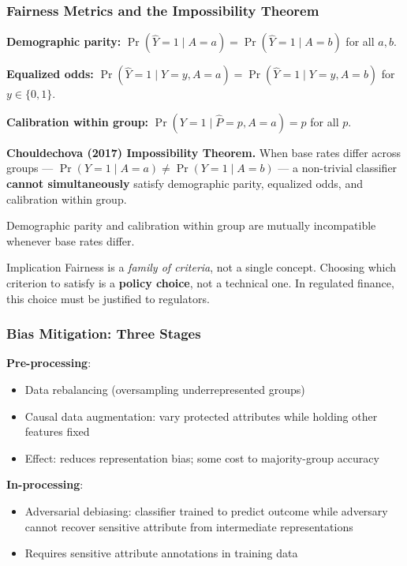 \documentclass[9pt,t]{beamer}
\begin{document}
\begin{frame}
\frametitle{Fairness Metrics and the Impossibility Theorem}

\textbf{Demographic parity:}
$\Pr(\hat{Y} = 1 \mid A = a) = \Pr(\hat{Y} = 1 \mid A = b)$ for all $a, b$.

\smallskip
\textbf{Equalized odds:}
$\Pr(\hat{Y} = 1 \mid Y = y, A = a) = \Pr(\hat{Y} = 1 \mid Y = y, A = b)$ for $y \in \{0, 1\}$.

\smallskip
\textbf{Calibration within group:}
$\Pr(Y = 1 \mid \hat{P} = p, A = a) = p$ for all $p$.

\smallskip
\begin{underhood}
  \textbf{Chouldechova (2017) Impossibility Theorem.}
  When base rates differ across groups --- $\Pr(Y=1 \mid A=a) \neq \Pr(Y=1 \mid A=b)$ ---
  a non-trivial classifier \textbf{cannot simultaneously} satisfy demographic parity,
  equalized odds, and calibration within group.

  Demographic parity and calibration within group are mutually incompatible
  whenever base rates differ.
\end{underhood}

\medskip
\begin{block}{Implication}
  Fairness is a \emph{family of criteria}, not a single concept.
  Choosing which criterion to satisfy is a \textbf{policy choice}, not a technical one.
  In regulated finance, this choice must be justified to regulators.
\end{block}
\end{frame}

\begin{frame}
\frametitle{Bias Mitigation: Three Stages}

\textbf{Pre-processing}:
\begin{itemize}
  \item Data rebalancing (oversampling underrepresented groups)
  \item Causal data augmentation: vary protected attributes while holding other features fixed
  \item Effect: reduces representation bias; some cost to majority-group accuracy
\end{itemize}

\medskip
\textbf{In-processing}:
\begin{itemize}
  \item Adversarial debiasing: classifier trained to predict outcome while adversary cannot recover sensitive attribute from intermediate representations
  \item Requires sensitive attribute annotations in training data
\end{itemize}
\end{frame}
\end{document}
